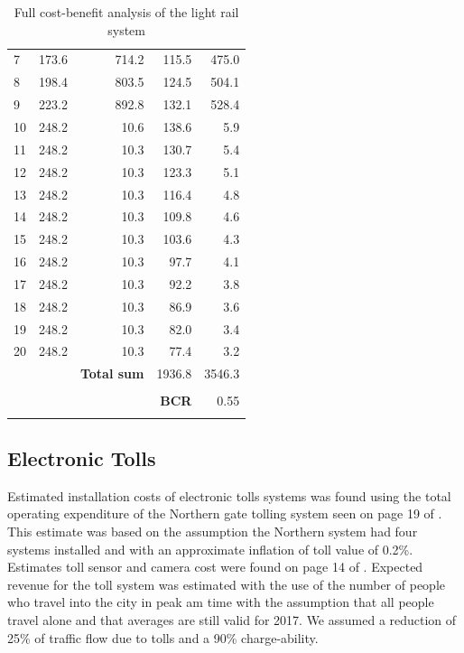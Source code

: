 \documentclass[twoside, a4paper, 11pt]{article}
\begin{document}
\begin{table}[H]
{\begin{tabular}{|l|r|r|r|r|}
7  & 173.6 & 714.2 & 115.5 & 475.0 \\
8  & 198.4 & 803.5 & 124.5 & 504.1 \\
9  & 223.2 & 892.8 & 132.1 & 528.4 \\
10 & 248.2 & 10.6  & 138.6 & 5.9   \\
11 & 248.2 & 10.3  & 130.7 & 5.4   \\
12 & 248.2 & 10.3  & 123.3 & 5.1   \\
13 & 248.2 & 10.3  & 116.4 & 4.8   \\
14 & 248.2 & 10.3  & 109.8 & 4.6   \\
15 & 248.2 & 10.3  & 103.6 & 4.3   \\
16 & 248.2 & 10.3  & 97.7  & 4.1   \\
17 & 248.2 & 10.3  & 92.2  & 3.8   \\
18 & 248.2 & 10.3  & 86.9  & 3.6   \\
19 & 248.2 & 10.3  & 82.0  & 3.4   \\
20 & 248.2 & 10.3  & 77.4  & 3.2  \\
&&\textbf{Total sum}&  1936.8  &3546.3\\
&&&&\\
&&&\cellcolor{green}\textbf{BCR}&\cellcolor{green}0.55\\
\Xhline{2\arrayrulewidth}
\end{tabular}
}
\caption{Full cost-benefit analysis of the light rail system}
\label{bcalr}
\end{table}
\newpage

\subsection{Electronic Tolls}
Estimated installation costs of electronic tolls systems was found using the total operating expenditure of the Northern gate tolling system seen on page 19 of \citep{ATND_3}. This estimate was based on the assumption the Northern system had four systems installed and with an approximate inflation of toll value of 0.2\%. \\

Estimates toll sensor and camera cost were found on page 14 of \citep{MattL13}. 
Expected revenue for the toll system was estimated with the use of the number of people who travel into the city in peak am time \citep{nightowler12} with the assumption that all people travel alone and that averages are still valid for 2017. We assumed a reduction of 25\% of traffic flow due to tolls and a 90\% charge-ability.\\
\end{document}
